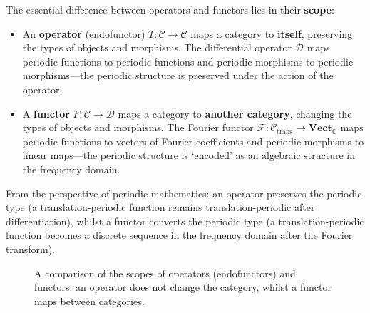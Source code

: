 \begin{remark}\label{rem:operator_vs_functor}
The essential difference between operators and functors lies in their \textbf{scope}:
\begin{itemize}
    \item An \textbf{operator} (endofunctor) $T: \mathcal{C} \to \mathcal{C}$ maps a category to \textbf{itself}, preserving the types of objects and morphisms. The differential operator $\mathcal{D}$ maps periodic functions to periodic functions and periodic morphisms to periodic morphisms---the periodic structure is preserved under the action of the operator.
    \item A \textbf{functor} $F: \mathcal{C} \to \mathcal{D}$ maps a category to \textbf{another category}, changing the types of objects and morphisms. The Fourier functor $\mathcal{F}: \mathcal{C}_{\text{trans}} \to \mathbf{Vect}_{\mathbb{C}}$ maps periodic functions to vectors of Fourier coefficients and periodic morphisms to linear maps---the periodic structure is `encoded' as an algebraic structure in the frequency domain.
\end{itemize}
From the perspective of periodic mathematics: an operator preserves the periodic type (a translation-periodic function remains translation-periodic after differentiation), whilst a functor converts the periodic type (a translation-periodic function becomes a discrete sequence in the frequency domain after the Fourier transform).
\end{remark}

\begin{figure}[htbp]
\centering
{}
\caption{A comparison of the scopes of operators (endofunctors) and functors: an operator does not change the category, whilst a functor maps between categories.}
\label{fig:operator_vs_functor}
\end{figure}

